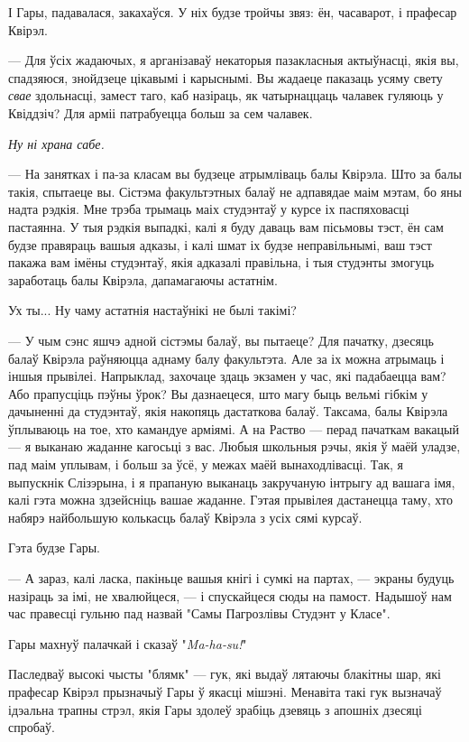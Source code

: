І Гары, падавалася, закахаўся. У ніх будзе тройчы звяз: ён, часаварот, і прафесар
Квірэл.

--- Для ўсіх жадаючых, я арганізаваў некаторыя пазакласныя актыўнасці, якія вы, 
спадзяюся, знойдзеце цікавымі і карыснымі. Вы жадаеце паказаць усяму свету 
\emph{свае} здольнасці, замест таго, каб назіраць, як чатырнаццаць чалавек 
гуляюць у Квіддзіч? Для арміі патрабуецца больш за сем чалавек.

\emph{Ну ні храна сабе.}

--- На занятках і па-за класам вы будзеце атрымліваць балы Квірэла. Што за балы такія,
спытаеце вы. Сістэма факультэтных балаў не адпавядае маім мэтам, бо яны надта рэдкія.
Мне трэба трымаць маіх студэнтаў у курсе іх паспяховасці пастаянна. У тыя рэдкія 
выпадкі, калі я буду даваць вам пісьмовы тэст, ён сам будзе правяраць вашыя адказы,
і калі шмат іх будзе неправільнымі, ваш тэст пакажа вам імёны студэнтаў,
якія адказалі правільна, і тыя студэнты змогуць заработаць балы 
Квірэла, дапамагаючы астатнім.

Ух ты... Ну чаму астатнія настаўнікі не былі такімі?

--- У чым сэнс яшчэ адной сістэмы балаў, вы пытаеце? Для пачатку, дзесяць 
балаў Квірэла раўняюцца аднаму балу факультэта. Але за іх можна атрымаць 
і іншыя прывілеі. Напрыклад, захочаце здаць экзамен у час, які падабаецца вам?
Або прапусціць пэўны ўрок? Вы дазнаецеся, што магу быць вельмі гібкім у 
дачыненні да студэнтаў, якія накопяць дастаткова балаў. Таксама, балы Квірэла 
ўплываюць на тое, хто камандуе арміямі. А на Раство --- перад пачаткам вакацый ---
я выканаю жаданне кагосьці з вас. Любыя школьныя рэчы, якія ў маёй уладзе,
пад маім уплывам, і больш за ўсё, у межах маёй вынаходлівасці.
Так, я выпускнік Слізэрына, і я прапаную выканаць закручаную інтрыгу ад 
вашага імя, калі гэта можна здзейсніць вашае жаданне. Гэтая прывілея дастанецца 
таму, хто набярэ найбольшую колькасць балаў Квірэла з усіх сямі курсаў.

Гэта будзе Гары.

--- А зараз, калі ласка, пакіньце вашыя кнігі і сумкі на партах, --- экраны будуць 
назіраць за імі, не хвалюйцеся, --- і спускайцеся сюды на памост. Надышоў нам 
час правесці гульню пад назвай "Самы Пагрозлівы Студэнт у Класе".


\later

Гары махнуў палачкай і сказаў "\emph{Ma-ha-su!}"

Паследваў высокі чысты "блямк" --- гук, які выдаў лятаючы блакітны шар, які 
прафесар Квірэл прызначыў Гары ў якасці мішэні. Менавіта такі гук вызначаў 
ідэальна трапны стрэл, якія Гары здолеў зрабіць дзевяць з апошніх 
дзесяці спробаў.

